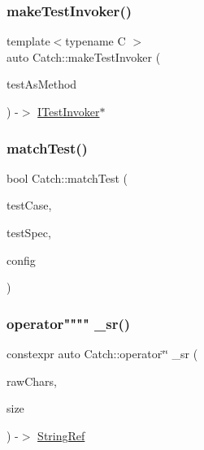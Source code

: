 \mbox{\label{namespace_catch_a82a954c4d70afa716115820dc7dc8d24}} 
\subsubsection{\texorpdfstring{make\+Test\+Invoker()}{makeTestInvoker()}\hspace{0.1cm}{\footnotesize\ttfamily [2/2]}}
{\footnotesize\ttfamily template$<$typename C $>$ \\
auto Catch\+::make\+Test\+Invoker (\begin{DoxyParamCaption}\item[{void(C\+::$\ast$)()}]{test\+As\+Method }\end{DoxyParamCaption}) -\/$>$ \mbox{\hyperlink{struct_catch_1_1_i_test_invoker}{I\+Test\+Invoker}}$\ast$ \hspace{0.3cm}{\ttfamily [noexcept]}}

\mbox{\label{namespace_catch_aadef80fbc6bc84589777a462770cef49}} 
\subsubsection{\texorpdfstring{match\+Test()}{matchTest()}}
{\footnotesize\ttfamily bool Catch\+::match\+Test (\begin{DoxyParamCaption}\item[{\mbox{\hyperlink{class_catch_1_1_test_case}{Test\+Case}} const \&}]{test\+Case,  }\item[{Test\+Spec const \&}]{test\+Spec,  }\item[{\mbox{\hyperlink{struct_catch_1_1_i_config}{I\+Config}} const \&}]{config }\end{DoxyParamCaption})}

\mbox{\label{namespace_catch_a47df617ba5e55ebe3394bdf6c0668b5a}} 
\subsubsection{\texorpdfstring{operator"""" \+\_\+sr()}{operator"" \_sr()}}
{\footnotesize\ttfamily constexpr auto Catch\+::operator\char`\"{}\char`\"{} \+\_\+sr (\begin{DoxyParamCaption}\item[{char const $\ast$}]{raw\+Chars,  }\item[{std\+::size\+\_\+t}]{size }\end{DoxyParamCaption}) -\/$>$ \mbox{\hyperlink{class_catch_1_1_string_ref}{String\+Ref}} \hspace{0.3cm}{\ttfamily [noexcept]}}

